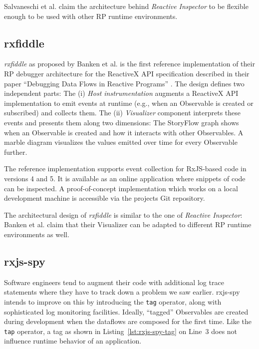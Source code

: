\documentclass[12pt,a4paper]{article}
\begin{document}
Salvaneschi et al. claim\cite{10.1145/2577080.2577083} the architecture behind \emph{Reactive Inspector} to be flexible enough to be used with other RP runtime environments.

\subsection{rxfiddle}

\emph{rxfiddle} as proposed by Banken et al. is the first reference implementation of their RP debugger architecture for the ReactiveX API specification described in their paper ``Debugging Data Flows in Reactive Programs'' \cite{10.1145/3180155.3180156}. The design defines two independent parts: The (i) \emph{Host instrumentation} augments a ReactiveX API implementation to emit events at runtime (e.g., when an Observable is created or subscribed) and collects them. The (ii) \emph{Visualizer} component interprets these events and presents them along two dimensions: The StoryFlow graph \cite{YWu2013a} shows when an Observable is created and how it interacts with other Observables. A marble diagram visualizes the values emitted over time for every Observable further.

The reference implementation supports event collection for RxJS-based code in versions 4 and 5. It is available as an online application where snippets of code can be inspected. A proof-of-concept implementation which works on a local development machine is accessible via the projects Git repository.

The architectural design of \emph{rxfiddle} is similar to the one of \emph{Reactive Inspector}: Banken et al. claim that their Visualizer can be adapted to different RP runtime environments as well.

\subsection{rxjs-spy}

Software engineers tend to augment their code with additional log trace statements where they have to track down a problem we saw earlier. rxjs-spy\cite{rxjsspy} intends to improve on this by introducing the \texttt{tag} operator, along with sophisticated log monitoring facilities. Ideally, ``tagged'' Observables are created during development when the dataflows are composed for the first time. Like the \texttt{tap} operator, a tag as shown in Listing~\ref{lst:rxjs-spy-tag} on Line~3 does not influence runtime behavior of an application.
\end{document}
